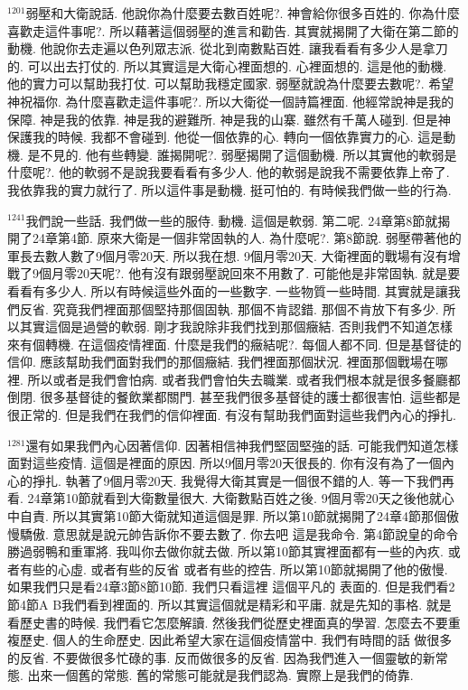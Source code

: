 \documentclass{book}
\begin{document}
$^{1201}$弱壓和大衛說話.
他說你為什麼要去數百姓呢?.
神會給你很多百姓的.
你為什麼喜歡走這件事呢?.
所以藉著這個弱壓的進言和勸告.
其實就揭開了大衛在第二節的動機.
他說你去走遍以色列眾志派.
從北到南數點百姓.
讓我看看有多少人是拿刀的.
可以出去打仗的.
所以其實這是大衛心裡面想的.
心裡面想的.
這是他的動機.
他的實力可以幫助我打仗.
可以幫助我穩定國家.
弱壓就說為什麼要去數呢?.
希望神祝福你.
為什麼喜歡走這件事呢?.
所以大衛從一個詩篇裡面.
他經常說神是我的保障.
神是我的依靠.
神是我的避難所.
神是我的山寨.
雖然有千萬人碰到.
但是神保護我的時候.
我都不會碰到.
他從一個依靠的心.
轉向一個依靠實力的心.
這是動機.
是不見的.
他有些轉變.
誰揭開呢?.
弱壓揭開了這個動機.
所以其實他的軟弱是什麼呢?.
他的軟弱不是說我要看看有多少人.
他的軟弱是說我不需要依靠上帝了.
我依靠我的實力就行了.
所以這件事是動機.
挺可怕的.
有時候我們做一些的行為.

$^{1241}$我們說一些話.
我們做一些的服侍.
動機.
這個是軟弱.
第二呢.
24章第8節就揭開了24章第4節.
原來大衛是一個非常固執的人.
為什麼呢?.
第8節說.
弱壓帶著他的軍長去數人數了9個月零20天.
所以我在想.
9個月零20天.
大衛裡面的戰場有沒有增戰了9個月零20天呢?.
他有沒有跟弱壓說回來不用數了.
可能他是非常固執.
就是要看看有多少人.
所以有時候這些外面的一些數字.
一些物質一些時間.
其實就是讓我們反省.
究竟我們裡面那個堅持那個固執.
那個不肯認錯.
那個不肯放下有多少.
所以其實這個是過營的軟弱.
剛才我說除非我們找到那個癥結.
否則我們不知道怎樣來有個轉機.
在這個疫情裡面.
什麼是我們的癥結呢?.
每個人都不同.
但是基督徒的信仰.
應該幫助我們面對我們的那個癥結.
我們裡面那個狀況.
裡面那個戰場在哪裡.
所以或者是我們會怕病.
或者我們會怕失去職業.
或者我們根本就是很多餐廳都倒閉.
很多基督徒的餐飲業都關門.
甚至我們很多基督徒的護士都很害怕.
這些都是很正常的.
但是我們在我們的信仰裡面.
有沒有幫助我們面對這些我們內心的掙扎.

$^{1281}$還有如果我們內心因著信仰.
因著相信神我們堅固堅強的話.
可能我們知道怎樣面對這些疫情.
這個是裡面的原因.
所以9個月零20天很長的.
你有沒有為了一個內心的掙扎.
執著了9個月零20天.
我覺得大衛其實是一個很不錯的人.
等一下我們再看.
24章第10節就看到大衛數量很大.
大衛數點百姓之後.
9個月零20天之後他就心中自責.
所以其實第10節大衛就知道這個是罪.
所以第10節就揭開了24章4節那個傲慢驕傲.
意思就是說元帥告訴你不要去數了.
你去吧 這是我命令.
第4節說皇的命令勝過弱鴨和重軍將.
我叫你去做你就去做.
所以第10節其實裡面都有一些的內疚.
或者有些的心虛.
或者有些的反省 或者有些的控告.
所以第10節就揭開了他的傲慢.
如果我們只是看24章3節8節10節.
我們只看這裡 這個平凡的 表面的.
但是我們看2節4節A B我們看到裡面的.
所以其實這個就是精彩和平庸.
就是先知的事格.
就是看歷史書的時候.
我們看它怎麼解讀.
然後我們從歷史裡面真的學習.
怎麼去不要重複歷史.
個人的生命歷史.
因此希望大家在這個疫情當中.
我們有時間的話 做很多的反省.
不要做很多忙碌的事.
反而做很多的反省.
因為我們進入一個靈敏的新常態.
出來一個舊的常態.
舊的常態可能就是我們認為.
實際上是我們的倚靠.
\end{document}
